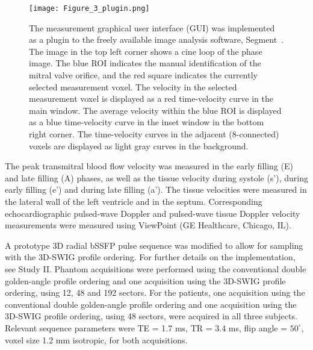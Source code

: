 \begin{figure}[htbp]
    \centering
    \texttt{[image: Figure\_3\_plugin.png]}
    \caption{The measurement graphical user interface (GUI) was implemented as a plugin to the freely available image analysis software, Segment~\cite{Heiberg2010}. The image in the top left corner shows a cine loop of the phase image. The blue ROI indicates the manual identification of the mitral valve orifice, and the red square indicates the currently selected measurement voxel. The velocity in the selected measurement voxel is displayed as a red time-velocity curve in the main window. The average velocity within the blue ROI is displayed as a blue time-velocity curve in the inset window in the bottom right corner. The time-velocity curves in the adjacent (8-connected) voxels are displayed as light gray curves in the background.}
    \label{fig:segment_gui}
\end{figure}

The peak transmitral blood flow velocity was measured in the early filling (E) and late filling (A) phases, as well as the tissue velocity during systole (s'), during early filling (e') and during late filling (a'). The tissue velocities were measured in the lateral wall of the left ventricle and in the septum. Corresponding echocardiographic pulsed-wave Doppler and pulsed-wave tissue Doppler velocity measurements were measured using ViewPoint (GE Healthcare, Chicago, IL).

A prototype 3D radial bSSFP pulse sequence was modified to allow for sampling with the 3D-SWIG profile ordering. For further details on the implementation, see Study II. Phantom acquisitions were performed using the conventional double golden-angle profile ordering and one acquisition using the 3D-SWIG profile ordering, using 12, 48 and 192 sectors. For the patients, one acquisition using the conventional double golden-angle profile ordering and one acquisition using the 3D-SWIG profile ordering, using 48 sectors, were acquired in all three subjects. Relevant sequence parameters were TE = 1.7 ms, TR = 3.4 ms, flip angle = $50^\circ$, voxel size 1.2 mm isotropic, for both acquisitions.